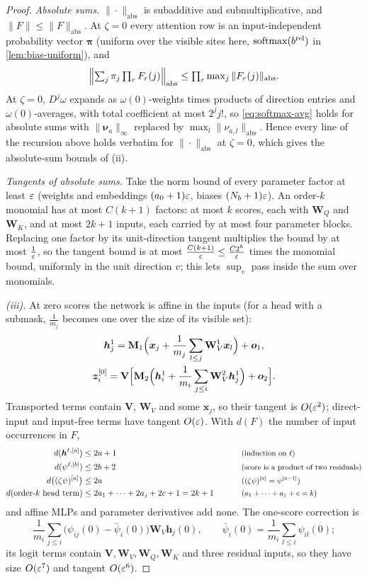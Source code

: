 \begin{proof}
\emph{Absolute sums.} $\|\cdot\|_{\mathrm{abs}}$ is subadditive and submultiplicative, and $\|F\|\le\|F\|_{\mathrm{abs}}$. At $\zeta=0$ every attention row is an
input-independent probability vector $\bm\pi$ (uniform over the visible sites here, $\operatorname{softmax}(b^{\mathrm{rel}})$ in \cref{lem:bias-uniform}), and
\[
 \Bigl\|\textstyle\sum_j\pi_j\prod_rF_r(j)\Bigr\|_{\mathrm{abs}}\le\prod_r\max_j\|F_r(j)\|_{\mathrm{abs}} .
\]
At $\zeta=0$, $D^j\omega$ expands as $\omega(0)$-weights times products of direction entries and $\omega(0)$-averages, with total coefficient at most $2^jj!$,
so \cref{eq:softmax-avg} holds for absolute sums with $\|\bm\nu_a\|_\infty$ replaced by $\max_l\|\nu_{a,l}\|_{\mathrm{abs}}$. Hence every line of the recursion
above holds verbatim for $\|\cdot\|_{\mathrm{abs}}$ at $\zeta=0$, which gives the absolute-sum bounds of (ii).

\emph{Tangents of absolute sums.} Take the norm bound of every parameter factor at least $\varepsilon$ (weights and embeddings $(a_0+1)\varepsilon$,
biases $(N_b+1)\varepsilon$). An order-$k$ monomial has at most $C(k+1)$ factors: at most $k$ scores, each with $\mathbf W_Q$ and $\mathbf W_K$, and at
most $2k+1$ inputs, each carried by at most four parameter blocks. Replacing one factor by its unit-direction tangent multiplies the bound by at
most $\frac{1}{\varepsilon}$, so the tangent bound is at most $\frac{C(k+1)}{\varepsilon}\le\frac{C2^k}{\varepsilon}$ times the monomial bound, uniformly in the unit direction
$v$; this lets $\sup_v$ pass inside the sum over monomials.

\emph{(iii).} At zero scores the network is affine in the inputs (for a head with a submask, $\frac{1}{m_j}$ becomes one over the size of its
visible set):
\begin{gather*}
 \bm h^1_j=\mathbf M_1\Bigl(\bm x_j+\frac{1}{m_j}\sum_{l\le j}\mathbf W^1_V\bm x_l\Bigr)+\bm o_1,\\
 \bm z^{[0]}_i=\mathbf V\Bigl[\mathbf M_2\Bigl(\bm h^1_i+\frac{1}{m_i}\sum_{j\le i}\mathbf W^2_V\bm h^1_j\Bigr)+\bm o_2\Bigr].
\end{gather*}
Transported terms contain $\mathbf V$, $\mathbf W_V$ and some $\bm x_j$, so their tangent is $O(\varepsilon^2)$; direct-input and input-free terms have tangent $O(\varepsilon)$.
With $d(F)$ the number of input occurrences in $F$,
\begin{alignat*}{2}
 d(\bm h^{\ell,[a]})&\le2a+1 &\qquad& \why{induction on $\ell$}\\
 d(\psi^{\ell,[b]})&\le2b+2 && \why{score is a product of two residuals}\\
 d\bigl((\zeta\psi)^{[a]}\bigr)&\le2a && \why{$(\zeta\psi)^{[a]}=\psi^{[a-1]}$}\\
 d(\text{order-$k$ head term})&\le2a_1+\cdots+2a_j+2c+1=2k+1 && \why{$a_1+\cdots+a_j+c=k$}
\end{alignat*}
and affine MLPs and parameter derivatives add none. The one-score correction is
\[
 \frac{1}{m_i}\sum_{j\le i}\bigl(\psi_{ij}(0)-\bar\psi_i(0)\bigr)\mathbf W_V\bm h_j(0),\qquad \bar\psi_i(0)=\frac{1}{m_i}\sum_{l\le i}\psi_{il}(0);
\]
its logit terms contain $\mathbf V,\mathbf W_V,\mathbf W_Q,\mathbf W_K$ and three residual inputs, so they have size $O(\varepsilon^7)$ and tangent $O(\varepsilon^6)$.


\end{proof}
